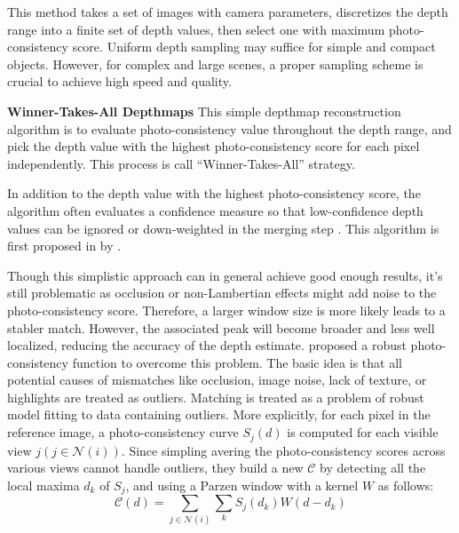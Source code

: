 This method takes a set of images with camera parameters, discretizes the depth range into a finite set of depth values, then select one with maximum photo-consistency score. Uniform depth sampling may suffice for simple and compact objects. However, for complex and large scenes, a proper sampling scheme is crucial to achieve high speed and quality.

\textbf{Winner-Takes-All Depthmaps} This simple depthmap reconstruction algorithm is to evaluate photo-consistency value throughout the depth range, and pick the depth value with the highest photo-consistency score for each pixel independently. This process is call ``Winner-Takes-All'' strategy.


In addition to the depth value with the highest photo-consistency score, the algorithm often evaluates a confidence measure so that low-confidence depth values can be ignored or down-weighted in the merging step \cite{hu2012quantitative}. This algorithm is first proposed in by \citeauthor{esteban2004silhouette}.

Though this simplistic approach can in general achieve good enough results, it's still problematic as occlusion or non-Lambertian effects might add noise to the photo-consistency score. Therefore, a larger window size is more likely leads to a stabler match. However, the associated peak will become broader and less well localized, reducing the accuracy of the depth estimate. \citeauthor{vogiatzis2007multiview} proposed a robust photo-consistency function to overcome this problem. The basic idea is that all potential causes of mismatches like occlusion, image noise, lack of texture, or highlights are treated as outliers. Matching is treated as a problem of robust model fitting to data containing outliers. More explicitly, for each pixel in the reference image, a photo-consistency curve $S_j(d)$ is computed for each visible view $j(j\in\mathcal{N}(i))$. Since simpling avering the photo-consistency scores across various views cannot handle outliers, they build a new $\mathcal{C}$ by detecting all the local maxima $d_k$ of $S_j$, and using a Parzen window with a kernel $W$ as follows:
\begin{equation}
\mathcal{C}(d) = \sum_{j\in\mathcal{N}(i)}\sum_k S_j(d_k)W(d - d_k)
\end{equation}\

